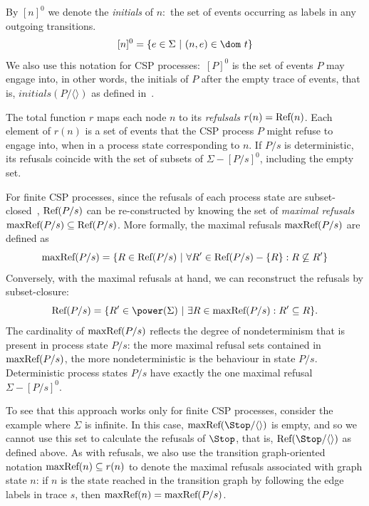 By $[n]^0$ we denote the \emph{initials} of $n$:~the set of events occurring
as labels in any outgoing transitions.
$$
[n]^0 = \{ e\in\Sigma~|~(n,e)\in\dom~t \}
$$
We also use this notation for CSP processes:~$[P]^0$ is the set
of events $P$ may engage into, in other words, the initials of $P$ after the
empty trace of events, that is, $initials(P/\langle\rangle)$ as defined
in~\cite{Roscoe2010}.

The total function $r$ maps each node $n$ to its \emph{refulsals} $r(n) =
\text{Ref}(n)$. Each element of $r(n)$ is a set of events that the CSP process $P$
might refuse to engage into, when in a process state corresponding to $n$.
 If $P/s$ is deterministic, its refusals coincide with the set of
subsets of $\Sigma - [P/s]^0$, including the empty set.


For finite CSP processes, since the refusals of each process state are
subset-closed~\cite{Hoare:1985:CSP:3921,Roscoe2010}, $\text{Ref}(P/s)$ can be
re-constructed by knowing the set of \emph{maximal refusals}
$\text{maxRef}(P/s)\subseteq\text{Ref}(P/s)$. More formally, the maximal refusals
$\text{maxRef}(P/s)$ are defined as
\begin{equation}
\text{maxRef}(P/s) = \{ R \in\text{Ref}(P/s)~|~\forall R'\in \text{Ref}(P/s) - \{ R\}: R \not\subseteq R'\}
\end{equation}
Conversely, with the maximal refusals at hand, we can reconstruct the refusals by subset-closure:
\begin{equation}
\refs(P/s) = \{ R'\in\power(\Sigma)~|~\exists R\in \maxrefs(P/s): R'\subseteq R \}.
\end{equation}
The cardinality of $\text{maxRef}(P/s)$ reflects the degree of
nondeterminism that is present in process state $P/s$: the more maximal refusal sets
contained in  $\text{maxRef}(P/s)$, the more nondeterministic is the behaviour in
state $P/s$. Deterministic process states $P/s$ have exactly the one maximal refusal
$\Sigma-[P/s]^0$.

To see that this approach works only for finite CSP processes, consider the
example where $\Sigma$ is infinite. In this case,
$\maxrefs(\Stop/\langle\rangle)$ is empty, and so we cannot use this set to
calculate the refusals of $\Stop$, that is, $\refs(\Stop/\langle\rangle)$ as
defined above. As with refusals, we also use the transition graph-oriented
notation $\text{maxRef}(n) \subseteq r(n)$ to denote the maximal refusals
associated with graph state $n$: if $n$ is the state reached in the
transition graph by following the edge labels in trace $s$, then $\text{maxRef}(n)
= \text{maxRef}(P/s)$.

